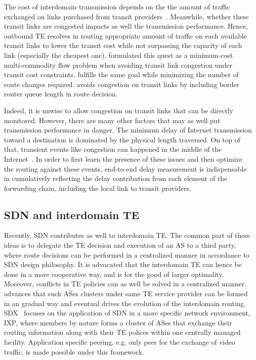 The cost of interdomain transmission depends on the the amount of traffic exchanged on links purchased from transit providers~\cite{drpeering-95th}.
Meanwhile, whether these transit links are congested impacts as well the transmission performance.
Hence, outbound TE resolves in routing appropriate amount of traffic on each available transit links to lower the transit cost while not surpassing the capacity of each link (especially the cheapest one).
\cite{Goldenberg2004} formulated this quest as a minimum-cost multi-commodity flow problem when avoiding transit link congestion under transit cost constraints.
\cite{Uhlig2004b} fulfills the same goal while minimizing the number of route changes required.
\cite{Zhu2014} avoids congestion on transit links by including border router queue length in route decision.

Indeed, it is unwise to allow congestion on transit links that can be directly monitored.
However, there are many other factors that may as well put transmission performance in danger.
The minimum delay of Internet transmission toward a destination is dominated by the physical length traversed. 
On top of that, transient events like congestion can happened in the middle of the Internet~\cite{Akella2003, Luckie2014}.
In order to first learn the presence of these issues and then optimize the routing against these events, end-to-end delay measurement is indispensable in cumulatively reflecting the delay contribution from each element of the forwarding chain, including the local link to transit providers.

\subsection{\ac{SDN} and interdomain TE}
Recently, \acf{SDN} contributes as well to interdomain TE. The common part of these ideas is to delegate the TE decision and execution of an AS to a third party, where route decisions can be performed in a centralized manner in accordance to \ac{SDN} design philosophy. It is advocated that the interdomain TE can hence be done in a more cooperative way, and is for the good of larger optimality. Moreover, conflicts in TE policies can as well be solved in a centralized manner.
\cite{Kotronis2012} advances that such ASes clusters under same TE service provider can be formed in an gradual way and eventual drives the evolution of the interdomain routing.
SDX~\cite{Gupta2014} focuses on the application of \ac{SDN} in a more specific network environment, \ac{IXP}, where members by nature forms a cluster of ASes that exchange their routing information along with their TE polices within one centrally managed facility. Application specific peering, e.g. only peer for the exchange of video traffic, is made possible under this framework.

